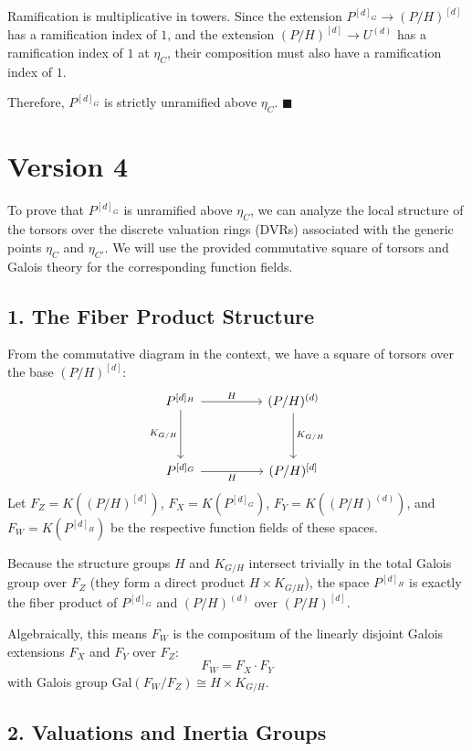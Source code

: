 Ramification is multiplicative in towers. Since the extension $P^{[d]_G} \to (P/H)^{[d]}$ has a ramification index of $1$, and the extension $(P/H)^{[d]} \to U^{(d)}$ has a ramification index of $1$ at $\eta_C$, their composition must also have a ramification index of $1$.

Therefore, $P^{[d]_G}$ is strictly unramified above $\eta_C$. \hfill $\blacksquare$



\section{Version 4}
To prove that $P^{[d]_G}$ is unramified above $\eta_C$, we can analyze the local structure of the torsors over the discrete valuation rings (DVRs) associated with the generic points $\eta_C$ and $\eta_{C'}$. We will use the provided commutative square of torsors and Galois theory for the corresponding function fields.

\subsection*{1. The Fiber Product Structure}

From the commutative diagram in the context, we have a square of torsors over the base $(P/H)^{[d]}$:
$$
\begin{tikzcd}[row sep=huge, column sep=huge]
    P^{[d]_H} \arrow[r, "H"] \arrow[d, "K_{G/H}"'] & (P/H)^{(d)} \arrow[d, "K_{G/H}"] \\
    P^{[d]_G} \arrow[r, "H"'] & (P/H)^{[d]}
\end{tikzcd}
$$
Let $F_Z = K((P/H)^{[d]})$, $F_X = K(P^{[d]_G})$, $F_Y = K((P/H)^{(d)})$, and $F_W = K(P^{[d]_H})$ be the respective function fields of these spaces.

Because the structure groups $H$ and $K_{G/H}$ intersect trivially in the total Galois group over $F_Z$ (they form a direct product $H \times K_{G/H}$), the space $P^{[d]_H}$ is exactly the fiber product of $P^{[d]_G}$ and $(P/H)^{(d)}$ over $(P/H)^{[d]}$.

Algebraically, this means $F_W$ is the compositum of the linearly disjoint Galois extensions $F_X$ and $F_Y$ over $F_Z$:
$$F_W = F_X \cdot F_Y$$
with Galois group $\text{Gal}(F_W / F_Z) \cong H \times K_{G/H}$.

\subsection*{2. Valuations and Inertia Groups}


